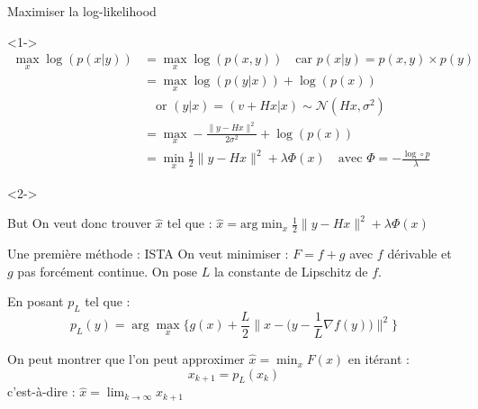 \documentclass[11pt]{beamer}
\begin{document}
\begin{frame}{Maximiser la log-likelihood}
    \begin{visibleenv}<1->
        \begin{align*}
            \max_x \log(p(x|y)) &= \max_x \log(p(x, y)) \quad \text{car } p(x|y) = p(x, y) \times p(y) \\
            &= \max_x \log(p(y|x)) + \log(p(x)) \\
            &\quad \text{or } (y|x) = (v+Hx|x) \sim \mathcal{N}(Hx, \sigma^2) \\
            &= \max_x -\frac{\lVert y-Hx \rVert ^2}{2 \sigma^2} + \log(p(x)) \\
            &= \min_x \frac{1}{2}\lVert y-Hx \rVert ^2 + \lambda \Phi(x) \quad \text{avec } \Phi = -\frac{\log \circ p}{\lambda}
        \end{align*}
    \end{visibleenv}

    \begin{visibleenv}<2->
        \begin{alertblock}{But}
            On veut donc trouver $\hat{x}$ tel que : $\hat{x} = \text{arg} \displaystyle \min_x \frac{1}{2} \lVert y-Hx \rVert ^2 + \lambda \Phi(x)$
        \end{alertblock}
    \end{visibleenv}
\end{frame}

\begin{frame}{Une première méthode : ISTA}
    On veut minimiser : $F = f + g$ avec $f$ dérivable et $g$ pas forcément continue.
    On pose $L$ la constante de Lipschitz de $f$.

    En posant $p_L$ tel que : $$ p_L(y) = \arg \max_x \Bigg\{ g(x) + \frac{L}{2} \Big\lVert x - \Big(y - \frac{1}{L} \nabla f(y)\Big) \Big\rVert ^2 \Bigg\}$$

    On peut montrer que l'on peut approximer $\hat{x} = \displaystyle \min_x F(x)$ en itérant :
    $$x_{k+1} = p_L(x_k)$$
    c'est-à-dire : $\hat{x} = \displaystyle \lim_{k \rightarrow \infty} x_{k+1}$

\end{frame}
\end{document}
